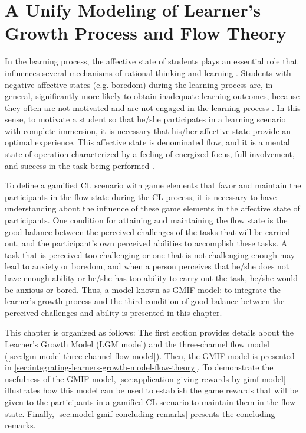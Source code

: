 \chapter[A Unify Modeling of Learner's Growth Process and Flow Theory]{A Unify Modeling of Learner's Growth Process and Flow Theory}
\label{chapter:unify-modeling-learner-growth-flow-theory}

In the learning process, the affective state of students plays an essential role that influences several mechanisms of rational thinking and learning \cite{DMello2012, Picard2000, ReisRodriguezLyraJaquesBittencourtIsotani2015}. Students with negative affective states (e.g. boredom) during the learning process are, in general, significantly more likely to obtain inadequate learning outcomes, because they often are not motivated and are not engaged in the learning process \cite{CraigGraesserSullinsGholson2004, ShernoffCsikszentmihalyiSchneiderShernoff2014}. In this sense, to motivate a student so that he/she participates in a learning scenario with complete immersion, it is necessary that his/her affective state provide an optimal experience. This affective state is denominated flow, and it is a mental state of operation characterized by a feeling of energized focus, full involvement, and success in the task being performed \cite{Csikszentmihalyi2008}. 

To define a gamified CL scenario with game elements that favor and maintain the participants in the flow state during the CL process, it is necessary to have understanding about the influence of these game elements in the affective state of participants. One condition for attaining and maintaining the flow state is the good balance between the perceived challenges of the tasks that will be carried out, and the participant’s own perceived abilities to accomplish these tasks. A task that is perceived too challenging or one that is not challenging enough may lead to anxiety or boredom, and when a person perceives that he/she does not have enough ability or he/she has too ability to carry out the task, he/she would be anxious or bored. Thus, a model known as GMIF model:  to integrate the learner's growth process and the third condition of good balance between the perceived challenges and ability is presented in this chapter. 

This chapter is organized as follows: The first section provides details about the Learner’s Growth Model (LGM model) and the three-channel flow model (\autoref{sec:lgm-model-three-channel-flow-model}). Then, the GMIF model is presented in \autoref{sec:integrating-learners-growth-model-flow-theory}. To demonstrate the usefulness of the GMIF model, \autoref{sec:application-giving-rewards-by-gimf-model} illustrates how this model can be used to establish the game rewards that will be given to the participants in a gamified CL scenario to maintain them in the flow state. Finally, \autoref{sec:model-gmif-concluding-remarks} presents the concluding remarks.

